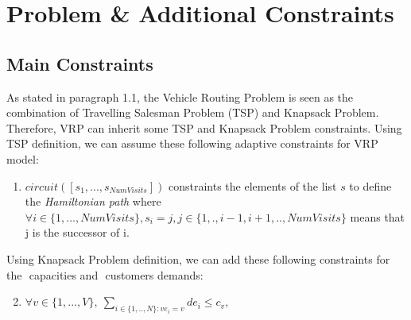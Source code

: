 \section{Problem \& Additional Constraints}
\subsection{Main Constraints}
As stated in paragraph 1.1, the Vehicle Routing Problem is seen as the combination of Travelling Salesman Problem (TSP) and Knapsack Problem. Therefore, VRP can inherit some TSP and Knapsack Problem constraints.
\newline
\newline
Using TSP definition, we can assume these following adaptive constraints for VRP model:
\begin{enumerate}
    \item \begin{math}circuit([s_{1},...,s_{NumVisits}])\end{math} constraints the elements of the list \begin{math}s\end{math} to define the \textit{Hamiltonian path} where \begin{math}\forall i \in \{1,...,NumVisits\},s_{i} = j, j \in \{1,., i-1,i+1,..,NumVisits\}\end{math} means that j is the successor of i.
\end{enumerate}
Using Knapsack Problem definition, we can add these following constraints for the \begin{math}[c_{1}, ..., c_{v}]\end{math} capacities and \begin{math}[de_{1}, ..., de_{N}]\end{math} customers demands:

\begin{enumerate}
 \setcounter{enumi}{1}
    \item \begin{math} \forall v \in \{1,..., V\}, \:\sum_{i \in \{1,..,N\} : ve_{i} = v}de_{i} \leq c_{v}, \end{math}
\end{enumerate}

